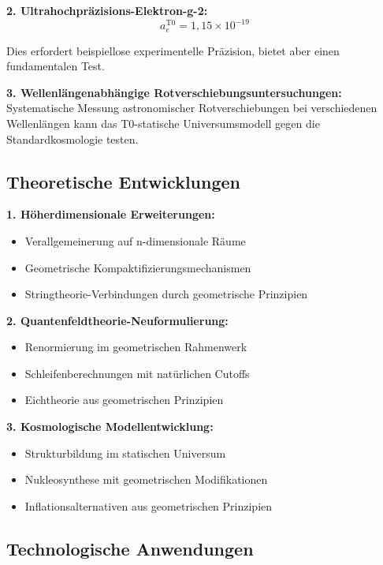 \documentclass[12pt,a4paper]{report}
\begin{document}
	\textbf{2. Ultrahochpräzisions-Elektron-g-2:}
	\begin{equation}
		a_e^{\text{T0}} = 1,15 \times 10^{-19}
	\end{equation}
	
	Dies erfordert beispiellose experimentelle Präzision, bietet aber einen fundamentalen Test.
	
	\textbf{3. Wellenlängenabhängige Rotverschiebungsuntersuchungen:}
	Systematische Messung astronomischer Rotverschiebungen bei verschiedenen Wellenlängen kann das T0-statische Universumsmodell gegen die Standardkosmologie testen.
	
	\subsection{Theoretische Entwicklungen}
	\label{subsec:theoretical_developments}
	
	\textbf{1. Höherdimensionale Erweiterungen:}
	\begin{itemize}
		\item Verallgemeinerung auf n-dimensionale Räume
		\item Geometrische Kompaktifizierungsmechanismen
		\item Stringtheorie-Verbindungen durch geometrische Prinzipien
	\end{itemize}
	
	\textbf{2. Quantenfeldtheorie-Neuformulierung:}
	\begin{itemize}
		\item Renormierung im geometrischen Rahmenwerk
		\item Schleifenberechnungen mit natürlichen Cutoffs
		\item Eichtheorie aus geometrischen Prinzipien
	\end{itemize}
	
	\textbf{3. Kosmologische Modellentwicklung:}
	\begin{itemize}
		\item Strukturbildung im statischen Universum
		\item Nukleosynthese mit geometrischen Modifikationen
		\item Inflationsalternativen aus geometrischen Prinzipien
	\end{itemize}
	
	\subsection{Technologische Anwendungen}
	\label{subsec:technological_applications}
	
\end{document}
